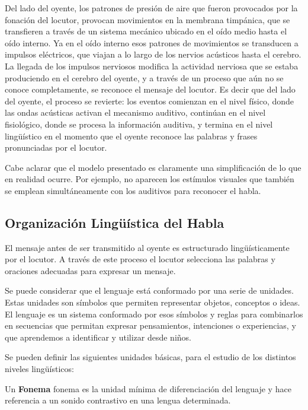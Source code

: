 Del lado del oyente, los patrones de presión de aire que fueron provocados por la fonación del locutor, provocan movimientos en la membrana timpánica, que se transfieren a través de un sistema mecánico ubicado en el oído medio hasta el oído interno. Ya en el oído interno esos patrones de movimientos se transducen a impulsos eléctricos, que
viajan a lo largo de los nervios acústicos hasta el cerebro. La llegada de los impulsos nerviosos modifica la actividad nerviosa que se estaba produciendo en el cerebro del oyente, y a través de un proceso que aún no se conoce completamente, se reconoce el mensaje del locutor. Es decir que del lado del oyente, el proceso se revierte: los eventos
comienzan en el nivel físico, donde las ondas acústicas activan el mecanismo auditivo, continúan en el nivel fisiológico, donde se procesa la información auditiva, y termina en el nivel lingüístico en el momento que el oyente reconoce las palabras y frases pronunciadas por el locutor.

Cabe aclarar que el modelo presentado es claramente una simplificación de lo que en realidad ocurre. Por ejemplo, no aparecen los estímulos visuales que también se emplean simultáneamente con los auditivos para reconocer el habla.

\subsection{ Organización Lingüística del Habla}

El mensaje antes de ser transmitido al oyente es estructurado lingüísticamente por el locutor. A través de este proceso el locutor selecciona las palabras y oraciones adecuadas para expresar un mensaje.

Se puede considerar que el lenguaje está conformado por una serie de unidades. Estas unidades son símbolos que permiten representar objetos, conceptos o ideas. El lenguaje es un sistema conformado por esos símbolos y reglas para combinarlos en secuencias que permitan
expresar pensamientos, intenciones o experiencias, y que aprendemos a identificar y utilizar desde niños.

Se pueden definir las siguientes unidades básicas, para el estudio de los distintos niveles lingüísticos:\\




\begin{defn}
 Un \textbf{Fonema} fonema es la unidad mínima de diferenciación del lenguaje y hace referencia a un sonido contrastivo en una lengua determinada. 
\end{defn}

